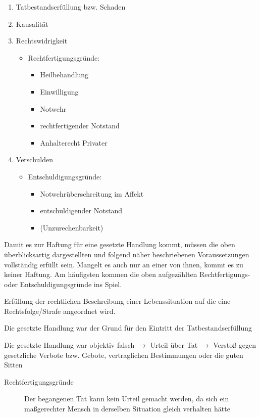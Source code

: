 \begin{enumerate}
  \item Tatbestandserfüllung bzw. Schaden
  \item Kausalität
  \item Rechtswidrigkeit
  \begin{itemize}
    \item
    Rechtfertigungsgründe:
    \begin{itemize}
      \item Heilbehandlung
      \item Einwilligung
      \item Notwehr
      \item rechtfertigender Notstand
      \item Anhalterecht Privater
    \end{itemize}
  \end{itemize}
  \item Verschulden
  \begin{itemize}
    \item
    Entschuldigungsgründe:
    \begin{itemize}
      \item Notwehrüberschreitung im Affekt
      \item entschuldigender Notstand
      \item (Unzurechenbarkeit)
    \end{itemize}
  \end{itemize}
\end{enumerate}

Damit es zur Haftung für eine gesetzte Handlung kommt, müssen die
oben überblicksartig dargestellten und folgend näher beschriebenen
Voraussetzungen vollständig erfüllt sein. Mangelt es auch nur an
einer von ihnen, kommt es zu keiner Haftung. Am häufigsten kommen die
oben aufgezählten Rechtfertigungs- oder Entschuldigungsgründe ins
Spiel.

{
Erfüllung der rechtlichen Beschreibung einer Lebenssituation auf die
eine Rechtsfolge/Strafe angeordnet wird.
}{}{}{}{}


{

Die gesetzte Handlung war der Grund für den Eintritt der
Tatbestandserfüllung
}{}{}{}{}


{
Die gesetzte Handlung war objektiv falsch ${\rightarrow}$ Urteil über
Tat ${\rightarrow}$ Verstoß gegen gesetzliche Verbote bzw. Gebote,
vertraglichen Bestimmungen oder die guten Sitten


\begin{description}
    \item[Rechtfertigungsgründe]  Der begangenen Tat kann kein Urteil gemacht werden, da sich ein
    maßgerechter Mensch in  derselben Situation gleich verhalten
    hätte
\end{description}
}{}{}{}{}


